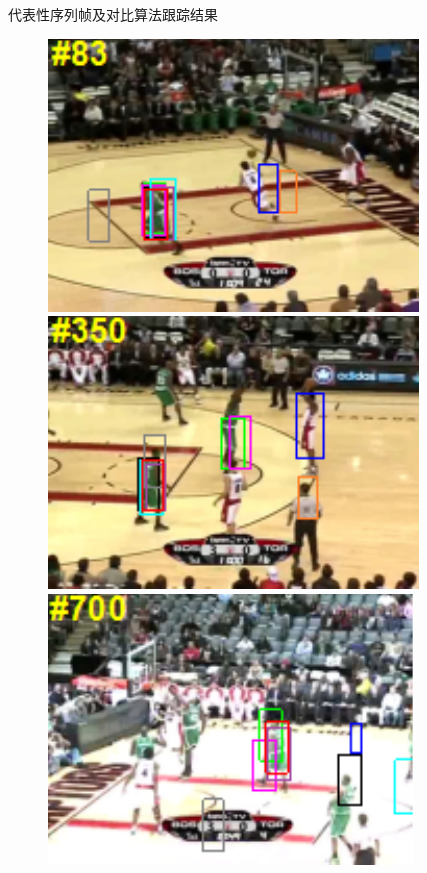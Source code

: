 \newcommand{\mycline}[1]{\tikz{\draw[#1 , line width=3] (0,0) -- (.2,0);}}
\begin{frame}{代表性序列帧及对比算法跟踪结果}

\begin{figure}[htp]
	
	\centering
\includegraphics[width=0.31\textheight,height=0.25\textheight]{figures/Figure2a1.pdf}
\includegraphics[width=0.31\textheight,height=0.25\textheight]{figures/Figure2a2.pdf}
\includegraphics[width=0.31\textheight,height=0.25\textheight]{figures/Figure2a3.pdf}\\


\end{figure}
\end{frame}
